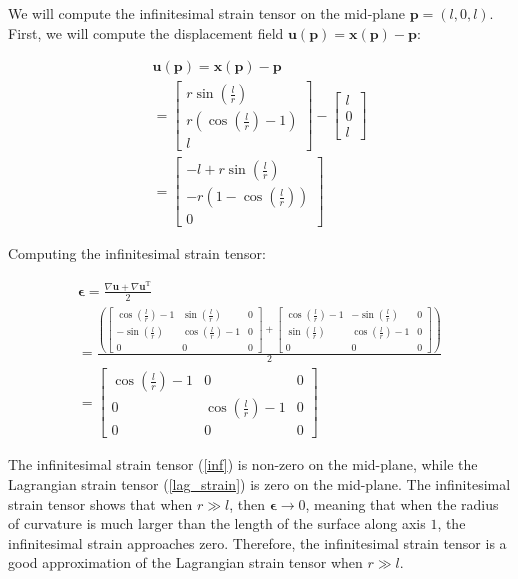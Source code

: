 \begin{problem}
    \noindent
    \normalfont

    We will compute the infinitesimal strain tensor on the mid-plane $\mathbf{p}=(l,0,l)$. First, we will compute the displacement field $\mathbf{u}(\mathbf{p})=\mathbf{x}(\mathbf{p})-\mathbf{p}$:

\begin{align}
\mathbf{u}(\mathbf{p})=\mathbf{x(p)}-\mathbf{p} \\
= \begin{bmatrix}
r\sin\left( \frac{l}{r} \right) \\
r\left( \cos\left( \frac{l}{r} \right)-1 \right) \\
l
\end{bmatrix}-\begin{bmatrix}
l \\
0 \\
l
\end{bmatrix} \\
=\begin{bmatrix}
-l+r\sin\left( \frac{l}{r} \right) \\
-r\left( 1-\cos\left( \frac{l}{r} \right) \right) \\
0
\end{bmatrix}
\end{align}

Computing the infinitesimal strain tensor:


\begin{align}
\mathbf{\epsilon}=\frac{\nabla \mathbf{u}+\nabla \mathbf{u}^{\text{T}}}{2} \\
=\frac{\left( \begin{bmatrix}
\cos\left( \frac{l}{r} \right)-1 & \sin\left( \frac{l}{r} \right) & 0 \\
-\sin\left( \frac{l}{r} \right) & \cos\left( \frac{l}{r} \right)-1 & 0 \\
0 & 0 & 0
\end{bmatrix}+\begin{bmatrix}
\cos\left( \frac{l}{r} \right)-1 & -\sin\left( \frac{l}{r} \right) & 0 \\
\sin\left( \frac{l}{r} \right) & \cos\left( \frac{l}{r} \right)-1 & 0 \\
0 & 0 & 0
\end{bmatrix} \right)}{2} \\
=\begin{bmatrix}
\cos\left( \frac{l}{r} \right)-1 & 0 & 0 \\
0 & \cos\left( \frac{l}{r} \right)-1 & 0 \\
0 & 0 & 0
\end{bmatrix}\label{inf}
\end{align}

The infinitesimal strain tensor (\ref{inf}) is non-zero on the mid-plane, while the Lagrangian strain tensor (\ref{lag_strain}) is zero on the mid-plane. The infinitesimal strain tensor  shows that when $r\gg l$, then $\mathbf{\epsilon}\to 0$, meaning that when the radius of curvature is much larger than the length of the surface along axis $1$, the infinitesimal strain approaches zero. Therefore, the infinitesimal strain tensor is a good approximation of the Lagrangian strain tensor when $r\gg l$.
\end{problem}